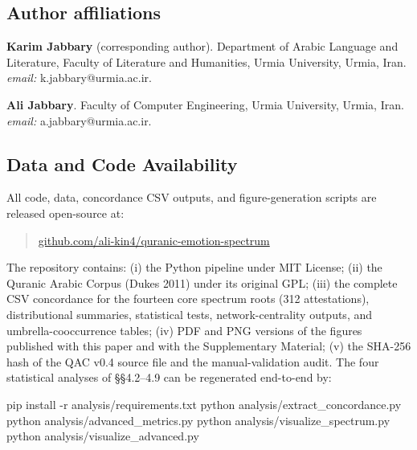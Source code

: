 \documentclass[11pt,a4paper]{article}
\providecommand{\NormalTok}[1]{#1}
\providecommand{\AttributeTok}[1]{#1}
\providecommand{\ExtensionTok}[1]{#1}
\providecommand{\NormalTok}[1]{#1}
\newenvironment{Shaded}{}{}
\begin{document}
\subsection{Author affiliations}\label{author-affiliations}

\textbf{Karim Jabbary} (corresponding author). Department of Arabic
Language and Literature, Faculty of Literature and Humanities, Urmia
University, Urmia, Iran. \emph{email:} k.jabbary@urmia.ac.ir.

\textbf{Ali Jabbary}. Faculty of Computer Engineering, Urmia University,
Urmia, Iran. \emph{email:} a.jabbary@urmia.ac.ir.

\subsection{Data and Code
Availability}\label{data-and-code-availability}

All code, data, concordance CSV outputs, and figure-generation scripts
are released open-source at:

\begin{quote}
\href{https://github.com/ali-kin4/quranic-emotion-spectrum}{github.com/ali-kin4/quranic-emotion-spectrum}
\end{quote}

The repository contains: (i) the Python pipeline under MIT License; (ii)
the Quranic Arabic Corpus (Dukes 2011) under its original GPL; (iii) the
complete CSV concordance for the fourteen core spectrum roots (312
attestations), distributional summaries, statistical tests,
network-centrality outputs, and umbrella-cooccurrence tables; (iv) PDF
and PNG versions of the figures published with this paper and with the
Supplementary Material; (v) the SHA-256 hash of the QAC v0.4 source file
and the manual-validation audit. The four statistical analyses of
§§4.2--4.9 can be regenerated end-to-end by:

\begin{Shaded}
\begin{Highlighting}[]
\ExtensionTok{pip}\NormalTok{ install }\AttributeTok{{-}r}\NormalTok{ analysis/requirements.txt}
\ExtensionTok{python}\NormalTok{ analysis/extract\_concordance.py}
\ExtensionTok{python}\NormalTok{ analysis/advanced\_metrics.py}
\ExtensionTok{python}\NormalTok{ analysis/visualize\_spectrum.py}
\ExtensionTok{python}\NormalTok{ analysis/visualize\_advanced.py}
\end{Highlighting}
\end{Shaded}
\end{document}

